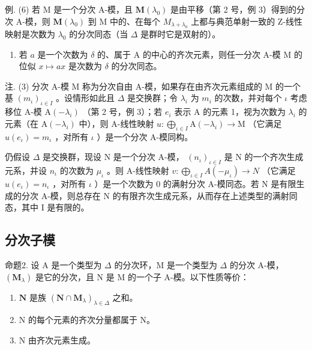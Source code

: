 例. (6) 若 M 是一个分次 A-模，且 \(\mathbf{M}(\lambda_{0})\) 是由平移（第 2 号，例 3）得到的分次 A-模，则 \(\mathbf{M}(\lambda_{0})\) 到 M 中的、在每个 \(M_{\lambda+\lambda_{0}}\) 上都与典范单射一致的 Z-线性映射是次数为 \(\lambda_{0}\) 的分次同态（当 \(\Delta\) 是群时它是双射的）。

\begin{enumerate}
\def\labelenumi{(\arabic{enumi})}
\setcounter{enumi}{6}
\tightlist
\item
  若 \(a\) 是一个次数为 \(\delta\) 的、属于 A 的中心的齐次元素，则任一分次 A-模 M 的位似 \(x \mapsto ax\) 是次数为 \(\delta\) 的分次同态。
\end{enumerate}

注. (3) 分次 A-模 M 称为分次自由 A-模，如果存在由齐次元素组成的 M 的一个基 \((m_{\iota})_{\iota \in I}\) 。设情形如此且 \(\Delta\) 是交换群；令 \(\lambda_{i}\) 为 \(m_{i}\) 的次数，并对每个 \(\iota\) 考虑移位 A-模 \(\mathrm{A}(-\lambda_{i})\) （第 2 号，例 3）；若 \(e_{i}\) 表示 A 的元素 1，视为次数为 \(\lambda_{i}\) 的元素（在 \(\mathrm{A}(-\lambda_{i})\) 中），则 A-线性映射 \(u: \bigoplus_{\iota \in I} \mathrm{A}(-\lambda_{i}) \to \mathrm{M}\) （它满足 \(u(e_{\iota}) = m_{\iota}\) ，对所有 \(\iota\) ）是一个分次 A-模同构。

仍假设 \(\Delta\) 是交换群，现设 N 是一个分次 A-模， \((n_{\iota})_{\iota \in I}\) 是 N 的一个齐次生成元系，并设 \(n_{\iota}\) 的次数为 \(\mu_{\iota}\) 。则 A-线性映射 \(v: \bigoplus_{\iota \in I} A(-\mu_{\iota}) \to N\) （它满足 \(u(e_{\iota}) = n_{\iota}\) ，对所有 \(\iota\) ）是一个次数为 0 的满射分次 A-模同态。若 N 是有限生成的分次 A-模，则总存在 N 的有限齐次生成元系，从而存在上述类型的满射同态，其中 I 是有限的。

\subsection{分次子模}

命题2. 设 A 是一个类型为 \(\Delta\) 的分次环，M 是一个类型为 \(\Delta\) 的分次 A-模， \((\mathbf{M}_{\lambda})\) 是它的分次，且 N 是 M 的一个子 A-模。以下性质等价：

\begin{enumerate}
\def\labelenumi{(\alph{enumi})}
\item
  \(\mathbf{N}\) 是族 \((\mathbf{N} \cap \mathbf{M}_{\lambda})_{\lambda \in \Delta}\) 之和。
\item
  N 的每个元素的齐次分量都属于 N。
\item
  N 由齐次元素生成。
\end{enumerate}

